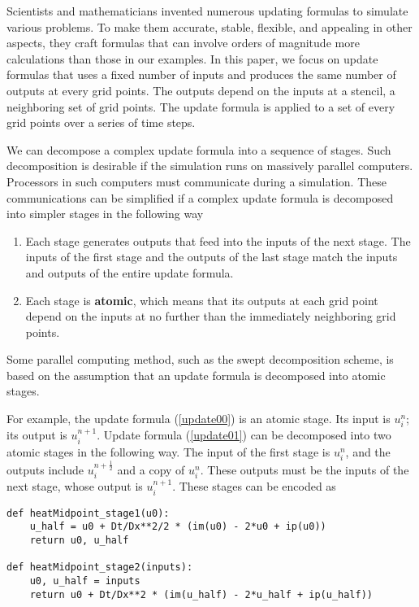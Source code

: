\documentclass[review]{siamart0216}
\begin{document}
Scientists and mathematicians invented numerous updating formulas to
simulate various problems.  To make them accurate, stable, flexible,
and appealing in other aspects, they craft formulas that can involve
orders of magnitude more calculations than those in our examples.
In this paper, we focus on update formulas that uses a fixed number of
inputs and produces the same number of outputs at every grid points.
The outputs depend on the inputs at a stencil, a neighboring set
of grid points.  The update formula is applied to a set of
every grid points over a series of time steps.

We can decompose a complex update formula into a sequence of stages.
Such decomposition is desirable if the simulation runs on
massively parallel computers.  Processors in such computers must
communicate during a simulation.  These communications can be simplified if
a complex update formula is decomposed into simpler stages in the following
way
\begin{enumerate}
\item Each stage generates outputs that feed into the inputs of the next stage.
      The inputs of the first stage and the outputs of the last stage match
      the inputs and outputs of the entire update formula.
\item Each stage is {\bf atomic}, which means that its outputs at
    each grid point depend on the
    inputs at no further than the immediately neighboring grid points.
\end{enumerate}
Some parallel computing method, such as the swept decomposition scheme,
is based on the assumption that an update formula is decomposed into atomic
stages.

For example, the update formula (\ref{update00}) is an atomic stage.
Its input is $u_i^n$; its output is $u_i^{n+1}$.  Update formula
(\ref{update01}) can be decomposed into two atomic stages in the following
way.  The input of the first stage is $u_i^n$, and the outputs include 
$u_i^{n+\frac12}$ and a copy of $u_i^{n}$.  These outputs must be the inputs of
the next stage, whose output is $u_i^{n+1}$.  These stages can be encoded as
\begin{lstlisting}
def heatMidpoint_stage1(u0):
    u_half = u0 + Dt/Dx**2/2 * (im(u0) - 2*u0 + ip(u0))
    return u0, u_half

def heatMidpoint_stage2(inputs):
    u0, u_half = inputs
    return u0 + Dt/Dx**2 * (im(u_half) - 2*u_half + ip(u_half))
\end{lstlisting}
\end{document}
